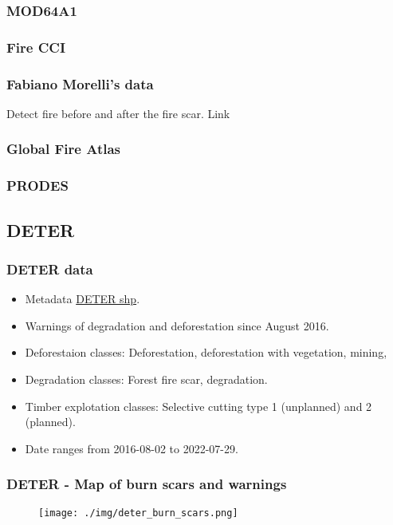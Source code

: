 \documentclass{beamer}
\begin{document}
\begin{frame}
    \frametitle{MOD64A1}
\end{frame}

\begin{frame}
    \frametitle{Fire CCI}
\end{frame}

\begin{frame}
    \frametitle{Fabiano Morelli's data}
    Detect fire before and after the fire scar. 
    Link 
\end{frame}



\begin{frame}
    \frametitle{Global Fire Atlas}
\end{frame}



\begin{frame}
    \frametitle{PRODES}
\end{frame}



\subsection{DETER}



\begin{frame}[fragile]
    \frametitle{DETER data}
    \begin{itemize}
        \item Metadata \href{http://terrabrasilis.dpi.inpe.br/geonetwork/srv/por/catalog.search#/metadata/f2153c4a-915b-48a6-8658-963bdce7366c}{DETER shp}.
        \item Warnings of degradation and deforestation since August 2016.
        \item Deforestaion classes: Deforestation, deforestation with 
            vegetation, mining, 
        \item Degradation classes: Forest fire scar, degradation.
        \item Timber explotation classes: Selective cutting type 1 (unplanned) 
            and 2 (planned).
        \item Date ranges from 2016-08-02 to 2022-07-29.
    \end{itemize}
\end{frame}





\begin{frame}
    \frametitle{DETER - Map of burn scars and warnings}
    \begin{figure}
        \centering
        \texttt{[image: ./img/deter\_burn\_scars.png]}
    \end{figure}
\end{frame}
\end{document}
